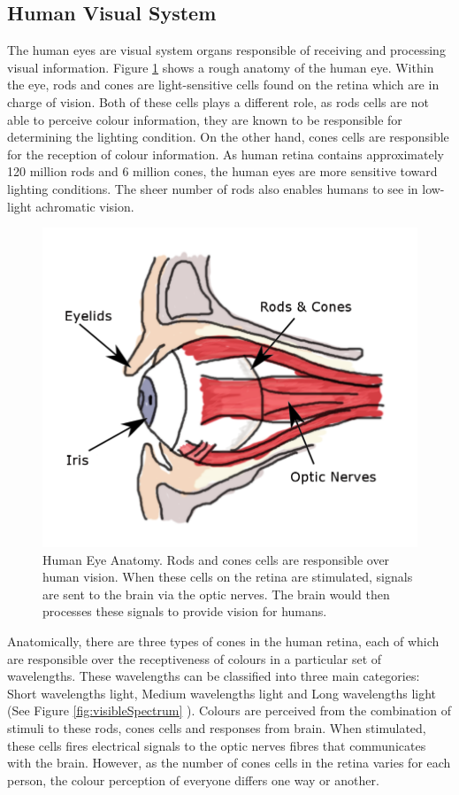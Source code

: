 \subsection{Human Visual System}
\label{section:eyes}
The human eyes are visual system organs responsible of receiving and
processing visual information. Figure \ref{fig:eyes} shows a rough anatomy of
the human eye. Within the eye, rods and cones are light-sensitive cells
found on the retina which are in charge of vision. Both of these cells plays
a different role, as rods cells are not able to perceive colour information,
they are known to be responsible for determining the lighting condition.
On the other hand, cones cells are responsible for the reception of colour
information. As human retina contains approximately 120 million rods and
6 million cones, the human eyes are more sensitive toward lighting conditions.
The sheer number of rods also enables humans to see in low-light achromatic
vision.


\begin{figure}[hbt!]\centering
 \includegraphics[width=.5\textwidth]{image/lit/rodsandconscolored.png}
 \caption[Human Eye Anatomy]{Human Eye Anatomy. Rods and cones cells are
 responsible over human vision. When these cells on the retina are stimulated,
 signals are sent to the brain via the optic nerves. The brain would then
 processes these signals to provide vision for humans.}
 \label{fig:eyes}
\end{figure}

Anatomically, there are three types of cones in the human retina, each of which
are responsible over the receptiveness of colours in a particular set of
wavelengths. These wavelengths can be classified into three main categories:
Short wavelengths light, Medium wavelengths light and Long wavelengths light
(See Figure \ref{fig:visibleSpectrum} \cite{eyespectrum}). Colours are perceived
from the combination of stimuli to these rods, cones cells and responses from
brain. When stimulated, these cells fires electrical signals to the optic nerves
fibres that communicates with the brain. However, as the number of cones cells
in the retina varies for each person, the colour perception of everyone differs
one way or another.


